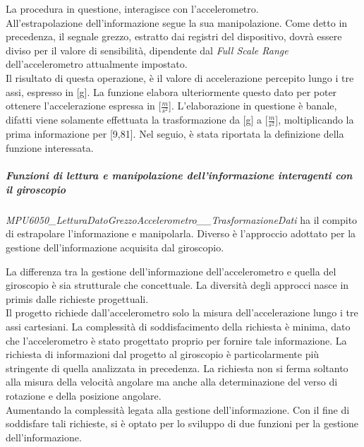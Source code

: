 \documentclass[11pt]{report}
\begin{document}
La procedura in questione, interagisce con l'accelerometro.\\
All'estrapolazione dell'informazione segue la sua manipolazione. Come detto in precedenza, il segnale grezzo, estratto dai registri del dispositivo, dovrà essere diviso per il valore di sensibilità, dipendente dal \textit{Full Scale Range} dell'accelerometro attualmente impostato.\\
Il risultato di questa operazione, è il valore di accelerazione percepito lungo i tre assi, espresso in [g]. La funzione elabora ulteriormente questo dato per poter ottenere l'accelerazione espressa in [$\frac{m}{s^2}$]. L'elaborazione in questione è banale, difatti viene solamente effettuata la trasformazione da [g] a [$\frac{m}{s^2}$], moltiplicando la prima informazione per [9,81].
Nel seguio, è stata riportata la definizione della funzione interessata.


\subparagraph{Funzioni di lettura e manipolazione dell'informazione interagenti con il giroscopio}
\textit{MPU6050\_LetturaDatoGrezzoAccelerometro\_\_TrasformazioneDati} ha il compito di estrapolare l'informazione e manipolarla. Diverso è l'approccio adottato per la gestione dell'informazione acquisita dal giroscopio.

La differenza tra la gestione dell'informazione dell'accelerometro e quella del giroscopio è sia strutturale che concettuale. La diversità degli approcci nasce in primis dalle richieste progettuali.\\
Il progetto richiede dall'accelerometro solo la misura dell'accelerazione lungo i tre assi cartesiani. La complessità di soddisfacimento della richiesta è minima, dato che l'accelerometro è stato progettato proprio per fornire tale informazione.
La richiesta di informazioni dal progetto al giroscopio è particolarmente più stringente di quella analizzata in precedenza. La richiesta non si ferma soltanto alla misura della velocità angolare ma anche alla determinazione del verso di rotazione e della posizione angolare.\\
Aumentando la complessità legata alla gestione dell'informazione.
Con il fine di soddisfare tali richieste, si è optato per lo sviluppo di due funzioni per la gestione dell'informazione.
\end{document}
